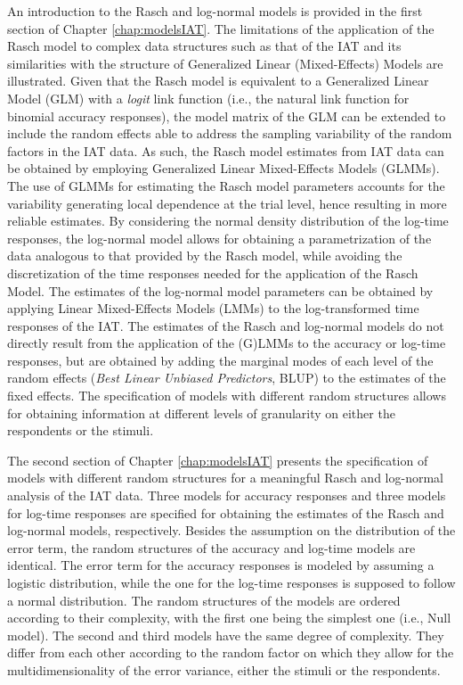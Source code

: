 \documentclass[12pt]{book}
\begin{document}
	An introduction to the Rasch and log-normal models is provided in the first section of Chapter \ref{chap:modelsIAT}. 
	The limitations of the application of the Rasch model to complex data structures such as that of the IAT and its similarities with the structure of Generalized Linear (Mixed-Effects) Models are illustrated. 
	Given that the Rasch model is equivalent to a Generalized Linear Model (GLM) with a \emph{logit} link function (i.e., the natural link function for binomial accuracy responses), the model matrix of the GLM can be extended to include the random effects able to address the sampling variability of the random factors in the IAT data. As such, the Rasch model estimates from IAT data can be obtained by employing Generalized Linear Mixed-Effects Models (GLMMs). 
	The use of GLMMs for estimating the Rasch model parameters accounts for the variability generating local dependence at the trial level, hence resulting in more reliable estimates. 
 By considering the normal density distribution of the log-time responses, the log-normal model allows for obtaining a parametrization of the data analogous to that provided by the Rasch model, while avoiding the discretization of the time responses needed for the application of the Rasch Model. 
	The estimates of the log-normal model parameters can be obtained by applying Linear Mixed-Effects Models (LMMs) to the log-transformed time responses of the IAT.
	The estimates of the Rasch and log-normal models do not directly result from the application of the (G)LMMs to the accuracy or log-time responses, but are obtained by adding the marginal modes of each level of the random effects (\emph{Best Linear Unbiased Predictors}, BLUP) to the estimates of the fixed effects. The specification of  models with different random structures allows for obtaining information at different levels of granularity on either the respondents or the stimuli.
	
	The second section of Chapter \ref{chap:modelsIAT} presents the specification of models with different random structures for a meaningful Rasch and log-normal analysis of the IAT data. 
	Three models for accuracy responses and three models for log-time responses are specified for obtaining the estimates of the Rasch and log-normal models, respectively. 
	Besides the assumption on the distribution of the error term, the random structures of the accuracy and log-time models are identical. 
	The error term for the accuracy responses is modeled by assuming a logistic distribution, while the one for the log-time responses is supposed to follow a normal distribution. 
	The random structures of the models are ordered according to their complexity, with the first one being the simplest one (i.e., Null model). 
	The second and third models have the same degree of complexity. They differ from each other according to the random factor on which they allow for the multidimensionality of the error variance, either the stimuli or the respondents. 
	
\end{document}
